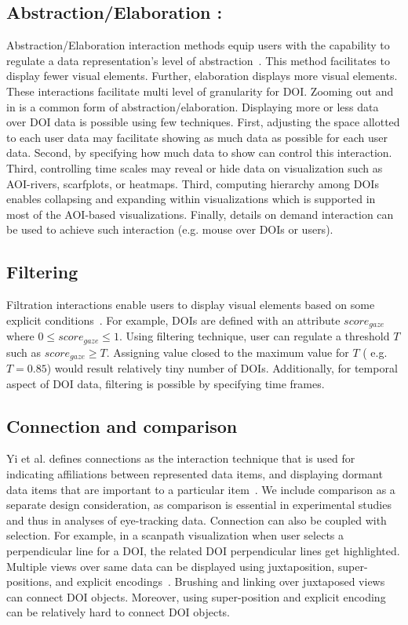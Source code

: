 \subsection{Abstraction/Elaboration :} Abstraction/Elaboration interaction methods equip users with the capability to regulate a data representation's level of abstraction~\cite{yi2007toward}. This method facilitates to display fewer visual elements. Further, elaboration displays more visual elements. These interactions facilitate multi level of granularity for DOI. Zooming out and in is a common form of abstraction/elaboration. Displaying more or less data over DOI data is possible using few techniques. First, adjusting the space allotted to each user data may facilitate showing as much data as possible for each user data. Second, by specifying how much data to show can control this interaction. Third, controlling time scales may reveal or hide data on visualization such as AOI-rivers, scarfplots, or  heatmaps. Third, computing hierarchy among DOIs enables collapsing and expanding within visualizations which is supported in most of the AOI-based visualizations. Finally, details on demand interaction can be used to achieve such interaction (e.g. mouse over DOIs or users).
	
	
\subsection{Filtering} Filtration interactions enable users to display visual elements based on some explicit conditions~\cite{yi2007toward}. For example, DOIs are defined with an attribute $score_{gaze}$ where $0 \leq score_{gaze} \leq 1$. Using filtering technique, user can regulate a threshold $T$ such as $score_{gaze} \geq T$. Assigning value closed to the maximum value for $T$ ( e.g. $T =0.85$) would result relatively tiny number of DOIs. Additionally, for temporal aspect of DOI data, filtering is possible by specifying time frames. 	

	
	\subsection{Connection and comparison} Yi et al. defines connections as the interaction technique that is used for indicating affiliations between represented data items, and displaying dormant data items that are important to a particular item~\cite{yi2007toward}. We include comparison as a separate design consideration, as comparison is essential in experimental studies and thus in analyses of eye-tracking data. Connection can also be coupled with selection. For example, in a scanpath visualization when user selects a perpendicular line for a DOI, the related DOI perpendicular lines get highlighted. Multiple views over same data can be displayed using juxtaposition, super-positions, and explicit encodings~\cite{gleicher2011visual}. Brushing and linking over juxtaposed views can connect DOI objects. Moreover, using super-position and explicit encoding can be relatively hard to connect DOI objects. 

